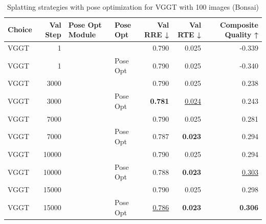 \begin{table}[H]
\caption{Splatting strategies with pose optimization for VGGT with 100 images (Bonsai)}
\label{tab:99_pose_opt_module_bonsai}
\begin{tabular}{lrllrrr}
\toprule
Choice & Val Step & Pose Opt Module & Pose Opt & Val RRE ↓ & Val RTE ↓ & Composite Quality ↑ \\
\midrule
VGGT & 1 &  &  & 0.790 & 0.025 & -0.339 \\
VGGT & 1 &  & Pose Opt & 0.790 & 0.025 & -0.340 \\
VGGT & 3000 &  &  & 0.790 & 0.025 & 0.238 \\
VGGT & 3000 &  & Pose Opt & \textbf{0.781} & \underline{0.024} & 0.243 \\
VGGT & 7000 &  &  & 0.790 & 0.025 & 0.281 \\
VGGT & 7000 &  & Pose Opt & 0.787 & \textbf{0.023} & 0.294 \\
VGGT & 10000 &  &  & 0.790 & 0.025 & 0.294 \\
VGGT & 10000 &  & Pose Opt & 0.788 & \textbf{0.023} & \underline{0.303} \\
VGGT & 15000 &  &  & 0.790 & 0.025 & 0.298 \\
VGGT & 15000 &  & Pose Opt & \underline{0.786} & \textbf{0.023} & \textbf{0.306} \\
\bottomrule
\end{tabular}
\end{table}
